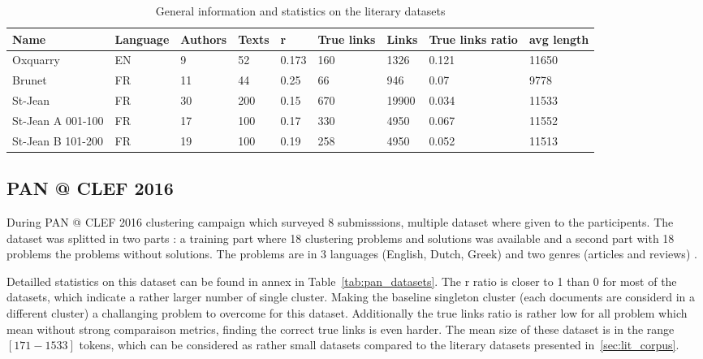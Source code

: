 \begin{table}[t]
  \caption{General information and statistics on the literary datasets}
  \label{tab:lit_datasets}
  \begin{tabular}{|l|l|l|l|l|l|l|l|l|}
    \hline
    \textbf{Name} &
    \textbf{Language} &
    \textbf{Authors} &
    \textbf{Texts} &
    \textbf{r} &
    \textbf{True links} &
    \textbf{Links} &
    \textbf{True links ratio} &
    \textbf{avg length} \\ \hline
    Oxquarry & EN & 9 & 52 & 0.173 & 160 & 1326 & 0.121 & 11650 \\ \hline
    Brunet & FR & 11 & 44 & 0.25 & 66 & 946 & 0.07 & 9778 \\ \hline
    St-Jean & FR & 30 & 200 & 0.15 & 670 & 19900 & 0.034 & 11533 \\ \hline
    St-Jean A 001-100 & FR & 17 & 100 & 0.17 & 330 & 4950 & 0.067 & 11552 \\ \hline
    St-Jean B 101-200 & FR & 19 & 100 & 0.19 & 258 & 4950 & 0.052 & 11513 \\ \hline
  \end{tabular}
\end{table}


\subsection{PAN @ CLEF 2016}

During PAN @ CLEF 2016 clustering campaign which surveyed 8 submisssions, multiple dataset where given to the participents.
The dataset was splitted in two parts : a training part where 18 clustering problems and solutions was available and a second part with 18 problems the problems without solutions.
The problems are in 3 languages (English, Dutch, Greek) and two genres (articles and reviews) \cite{pan16}.

Detailled statistics on this dataset can be found in annex in Table~\ref{tab:pan_datasets}.
The r ratio is closer to 1 than 0 for most of the datasets, which indicate a rather larger number of single cluster.
Making the baseline singleton cluster (each documents are considerd in a different cluster) a challanging problem to overcome for this dataset.
Additionally the true links ratio is rather low for all problem which mean without strong comparaison metrics, finding the correct true links is even harder.
The mean size of these dataset is in the range $[171-1533]$ tokens, which can be considered as rather small datasets compared to the literary datasets presented in~\ref{sec:lit_corpus}.


